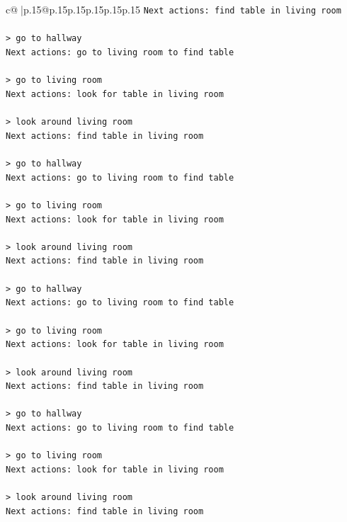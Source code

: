 \documentclass{article}
\begin{document}
{\begin{supertabular}{c@{$\;$}|p{.15\linewidth}@{}p{.15\linewidth}p{.15\linewidth}p{.15\linewidth}p{.15\linewidth}p{.15\linewidth}}
{{{\texttt{Next actions: find table in living room} \\
\\ 
\texttt{> go to hallway} \\
\texttt{Next actions: go to living room to find table} \\
\\ 
\texttt{> go to living room} \\
\texttt{Next actions: look for table in living room} \\
\\ 
\texttt{> look around living room} \\
\texttt{Next actions: find table in living room} \\
\\ 
\texttt{> go to hallway} \\
\texttt{Next actions: go to living room to find table} \\
\\ 
\texttt{> go to living room} \\
\texttt{Next actions: look for table in living room} \\
\\ 
\texttt{> look around living room} \\
\texttt{Next actions: find table in living room} \\
\\ 
\texttt{> go to hallway} \\
\texttt{Next actions: go to living room to find table} \\
\\ 
\texttt{> go to living room} \\
\texttt{Next actions: look for table in living room} \\
\\ 
\texttt{> look around living room} \\
\texttt{Next actions: find table in living room} \\
\\ 
\texttt{> go to hallway} \\
\texttt{Next actions: go to living room to find table} \\
\\ 
\texttt{> go to living room} \\
\texttt{Next actions: look for table in living room} \\
\\ 
\texttt{> look around living room} \\
\texttt{Next actions: find table in living room} \\
}}}
\end{supertabular}}
\end{document}
